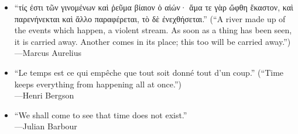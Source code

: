 \documentclass[mathserif,xcolor={dvipsnames,table}]{beamer}
\begin{document}
\begin{frame}
\begin{itemize}
\item `` τίς ἐστι τῶν γινομένων καὶ ῥεῦμα βίαιον ὁ αἰών· ἅμα
τε γὰρ ὤφθη ἕκαστον, καὶ παρενήνεκται καὶ ἄλλο παραφέρεται, τὸ δὲ
ἐνεχθήσεται.\latintext'' (``A river made up of the events which
happen, a violent stream. As soon as a thing has been seen, it is
carried away. Another comes in its place; this too will be carried away.'')\\ \hfill---Marcus Aurelius
\vfill
\item {}``Le temps est ce qui empêche que tout soit donné tout d'un coup.'' \latintext (``Time
	keeps everything from happening all at once.'')\\ \hfill---Henri Bergson
\vfill
\item ``We shall come to see that time does not exist.''\\ \hfill---Julian Barbour
\end{itemize}
\end{frame}
\end{document}
